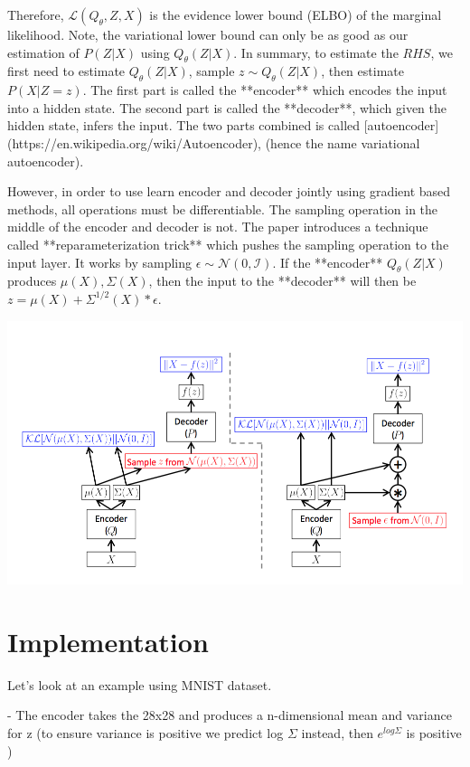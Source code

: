 \documentclass[graybox]{svmult}
\begin{document}
Therefore, $\mathcal{L}(Q_{\theta}, Z, X)$ is the evidence lower bound (ELBO) of the marginal likelihood. Note, the variational lower bound can only be as good as our estimation of $P(Z|X)$ using $Q_{\theta}(Z|X)$. In summary, to estimate the $RHS$, we first need to estimate $Q_{\theta}(Z|X)$, sample $z \sim Q_{\theta}(Z|X)$, then estimate $P(X|Z = z)$. The first part is called the **encoder** which encodes the input into a hidden state. The second part is called the **decoder**, which given the hidden state, infers the input. The two parts combined is called [autoencoder](https://en.wikipedia.org/wiki/Autoencoder), (hence the name variational autoencoder).

However, in order to use learn encoder and decoder jointly using gradient based methods, all operations must be differentiable. The sampling operation in the middle of the encoder and decoder is not. The paper introduces a technique called **reparameterization trick** which pushes the sampling operation to the input layer. It works by sampling $\epsilon \sim \mathcal{N(0, I)}$. If the **encoder** $Q_{\theta}(Z|X)$ produces $\mu(X), \Sigma(X)$, then the input to the **decoder** will then be $z = \mu(X) + \Sigma^{1/2}(X)*\epsilon$.

\includegraphics[width=\textwidth]{reparam.png}

\section{Implementation}


Let's look at an example using MNIST dataset.

- The encoder takes the 28x28 and produces a n-dimensional mean and variance for z (to ensure variance is positive we predict log $\Sigma$ instead, then $e^{log\Sigma}$ is positive )
\end{document}
